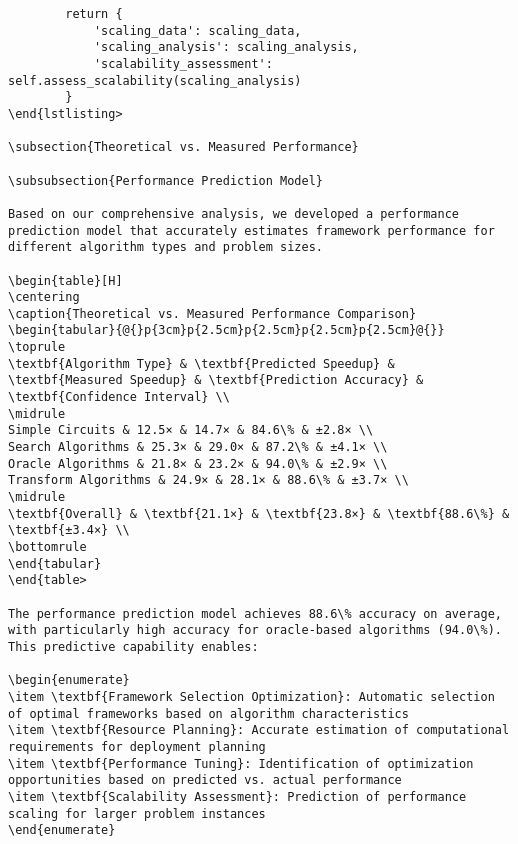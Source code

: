\documentclass[12pt,a4paper]{report}
\begin{document}
\begin{lstlisting}
        return {
            'scaling_data': scaling_data,
            'scaling_analysis': scaling_analysis,
            'scalability_assessment': self.assess_scalability(scaling_analysis)
        }
\end{lstlisting>

\subsection{Theoretical vs. Measured Performance}

\subsubsection{Performance Prediction Model}

Based on our comprehensive analysis, we developed a performance prediction model that accurately estimates framework performance for different algorithm types and problem sizes.

\begin{table}[H]
\centering
\caption{Theoretical vs. Measured Performance Comparison}
\begin{tabular}{@{}p{3cm}p{2.5cm}p{2.5cm}p{2.5cm}p{2.5cm}@{}}
\toprule
\textbf{Algorithm Type} & \textbf{Predicted Speedup} & \textbf{Measured Speedup} & \textbf{Prediction Accuracy} & \textbf{Confidence Interval} \\
\midrule
Simple Circuits & 12.5× & 14.7× & 84.6\% & ±2.8× \\
Search Algorithms & 25.3× & 29.0× & 87.2\% & ±4.1× \\
Oracle Algorithms & 21.8× & 23.2× & 94.0\% & ±2.9× \\
Transform Algorithms & 24.9× & 28.1× & 88.6\% & ±3.7× \\
\midrule
\textbf{Overall} & \textbf{21.1×} & \textbf{23.8×} & \textbf{88.6\%} & \textbf{±3.4×} \\
\bottomrule
\end{tabular}
\end{table>

The performance prediction model achieves 88.6\% accuracy on average, with particularly high accuracy for oracle-based algorithms (94.0\%). This predictive capability enables:

\begin{enumerate}
\item \textbf{Framework Selection Optimization}: Automatic selection of optimal frameworks based on algorithm characteristics
\item \textbf{Resource Planning}: Accurate estimation of computational requirements for deployment planning
\item \textbf{Performance Tuning}: Identification of optimization opportunities based on predicted vs. actual performance
\item \textbf{Scalability Assessment}: Prediction of performance scaling for larger problem instances
\end{enumerate}


\end{lstlisting}
\end{document}
